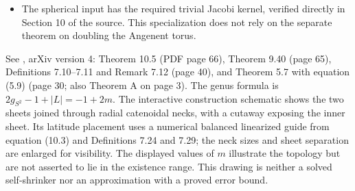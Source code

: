 \begin{example}
\begin{itemize}
\item The spherical input has the required trivial Jacobi kernel, verified directly in Section 10 of the source. This specialization does not rely on the separate theorem on doubling the Angenent torus.
\end{itemize}
See \cite{CatKapouleasMcGrath2023}, arXiv version 4: Theorem 10.5 (PDF page 66), Theorem 9.40 (page 65), Definitions 7.10--7.11 and Remark 7.12 (page 40), and Theorem 5.7 with equation (5.9) (page 30; also Theorem A on page 3). The genus formula is $2g_{S^2}-1+|L|=-1+2m$. The interactive construction schematic shows the two sheets joined through radial catenoidal necks, with a cutaway exposing the inner sheet. Its latitude placement uses a numerical balanced linearized guide from equation (10.3) and Definitions 7.24 and 7.29; the neck sizes and sheet separation are enlarged for visibility. The displayed values of $m$ illustrate the topology but are not asserted to lie in the existence range. This drawing is neither a solved self-shrinker nor an approximation with a proved error bound.
\end{example}

